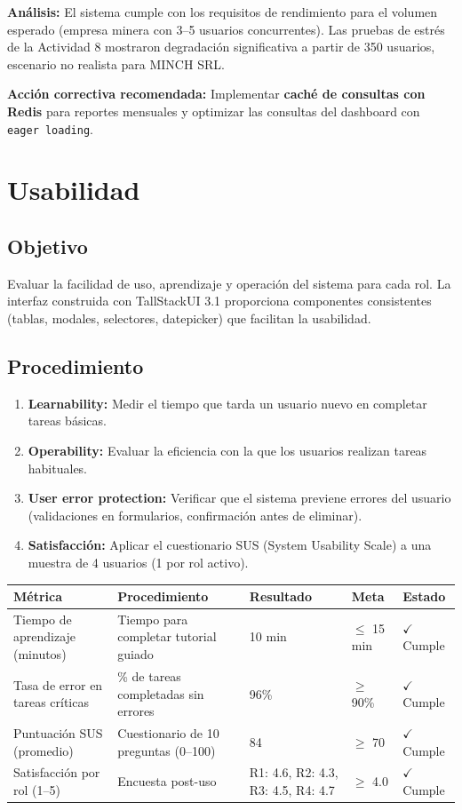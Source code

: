 \documentclass[stu]{apa7}
\begin{document}
\textbf{Análisis:} El sistema cumple con los requisitos de rendimiento para el volumen esperado (empresa minera con 3--5 usuarios concurrentes). Las pruebas de estrés de la Actividad 8 mostraron degradación significativa a partir de 350 usuarios, escenario no realista para MINCH SRL.

\textbf{Acción correctiva recomendada:} Implementar \textbf{caché de consultas con Redis} para reportes mensuales y optimizar las consultas del dashboard con \texttt{eager loading}.

\section{Usabilidad}

\subsection{Objetivo}

Evaluar la facilidad de uso, aprendizaje y operación del sistema para cada rol. La interfaz construida con TallStackUI 3.1 proporciona componentes consistentes (tablas, modales, selectores, datepicker) que facilitan la usabilidad.

\subsection{Procedimiento}

\begin{enumerate}
    \item \textbf{Learnability:} Medir el tiempo que tarda un usuario nuevo en completar tareas básicas.
    \item \textbf{Operability:} Evaluar la eficiencia con la que los usuarios realizan tareas habituales.
    \item \textbf{User error protection:} Verificar que el sistema previene errores del usuario (validaciones en formularios, confirmación antes de eliminar).
    \item \textbf{Satisfacción:} Aplicar el cuestionario SUS (System Usability Scale) a una muestra de 4 usuarios (1 por rol activo).
\end{enumerate}

\begin{longtable}{|L{4cm}|L{3.5cm}|C{2.5cm}|C{2cm}|C{1.5cm}|}
\hline
{}
\textbf{Métrica} & \textbf{Procedimiento} & \textbf{Resultado} & \textbf{Meta} & \textbf{Estado} \\
\hline
Tiempo de aprendizaje (minutos) & Tiempo para completar tutorial guiado & 10 min & $\leq$ 15 min & $\checkmark$ Cumple \\
\hline
Tasa de error en tareas críticas & \% de tareas completadas sin errores & 96\% & $\geq$ 90\% & $\checkmark$ Cumple \\
\hline
Puntuación SUS (promedio) & Cuestionario de 10 preguntas (0--100) & 84 & $\geq$ 70 & $\checkmark$ Cumple \\
\hline
Satisfacción por rol (1--5) & Encuesta post-uso & R1: 4.6, R2: 4.3, R3: 4.5, R4: 4.7 & $\geq$ 4.0 & $\checkmark$ Cumple \\
\hline
\end{longtable}
\end{document}
